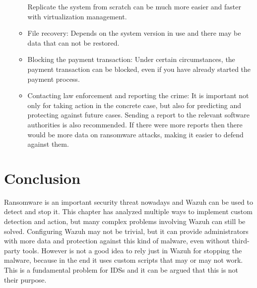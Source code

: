 \begin{itemize}
\begin{itemize}
Replicate the system from scratch can be much more easier and faster with virtualization management.
		\item File recovery:
Depends on the system version in use and there may be data that can not be restored.
		\item Blocking the payment transaction:
Under certain circumstances, the payment transaction can be blocked, even if you have already started the payment process.
		\item Contacting law enforcement and reporting the crime:
It is important not only for taking action in the concrete case, but also for predicting and protecting against future cases.
Sending a report to the relevant software authorities is also recommended.
If there were more reports then there would be more data on ransomware attacks, making it easier to defend against them.
	\end{itemize}
\end{itemize}

\section{Conclusion}
Ransomware is an important security threat nowadays and Wazuh can be used to detect and stop it.
This chapter has analyzed multiple ways to implement custom detection and action, but many complex problems involving Wazuh can still be solved.
Configuring Wazuh may not be trivial, but it can provide administrators with more data and protection against this kind of malware, even without third-party tools.
\linej
However is not a good idea to rely just in Wazuh for stopping the malware, because in the end it uses custom scripts that may or may not work.
This is a fundamental problem for IDSs and it can be argued that this is not their purpose.
